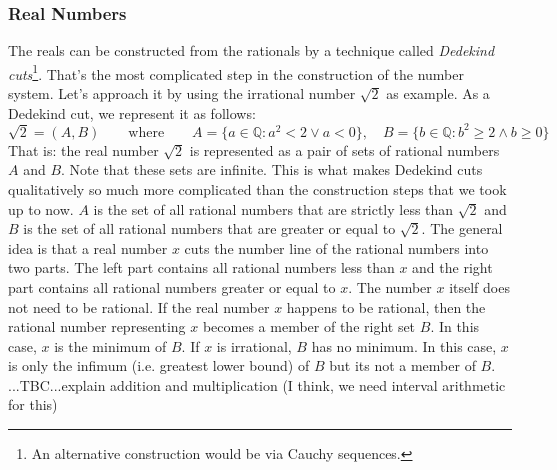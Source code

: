 \subsubsection{Real Numbers} The reals can be constructed from the rationals by a technique called \emph{Dedekind cuts}\footnote{An alternative construction would be via Cauchy sequences.}. That's the most complicated step in the construction of the number system. Let's approach it by using the irrational number $\sqrt{2}$ as example. As a Dedekind cut, we represent it as follows:
\begin{equation}
\sqrt{2} = (A, B) \qquad \text{where} \qquad
A = \{a \in \mathbb{Q} : a^2  <   2 \vee   a   <  0\}, \quad
B = \{b \in \mathbb{Q} : b^2 \geq 2 \wedge b \geq 0\}
\end{equation}
That is: the real number $\sqrt{2}$ is represented as a pair of sets of rational numbers $A$ and $B$. Note that these sets are infinite. This is what makes Dedekind cuts qualitatively so much more complicated than the construction steps that we took up to now. $A$ is the set of all rational numbers that are strictly less than $\sqrt{2}$ and $B$ is the set of all rational numbers that are greater or equal to $\sqrt{2}$. The general idea is that a real number $x$ cuts the number line of the rational numbers into two parts. The left part contains all rational numbers less than $x$ and the right part contains all rational numbers greater or equal to $x$. The number $x$ itself does not need to be rational. If the real number $x$ happens to be rational, then the rational number representing $x$ becomes a member of the right set $B$. In this case, $x$ is the minimum of $B$. If $x$ is irrational, $B$ has no minimum. In this case, $x$ is only the infimum (i.e. greatest lower bound) of $B$ but its not a member of $B$. ...TBC...explain addition and multiplication (I think, we need interval arithmetic for this)






